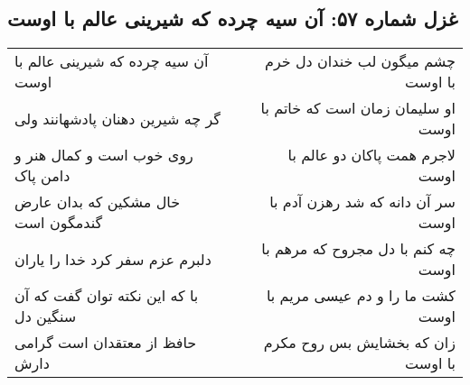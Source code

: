 \begin{center}
\section*{غزل شماره ۵۷: آن سیه چرده که شیرینی عالم با اوست}
\label{sec:sh057}
\begin{longtable}{l p{0.5cm} r}
آن سیه چرده که شیرینی عالم با اوست
&&
چشم میگون لب خندان دل خرم با اوست
\\
گر چه شیرین دهنان پادشهانند ولی
&&
او سلیمان زمان است که خاتم با اوست
\\
روی خوب است و کمال هنر و دامن پاک
&&
لاجرم همت پاکان دو عالم با اوست
\\
خال مشکین که بدان عارض گندمگون است
&&
سر آن دانه که شد رهزن آدم با اوست
\\
دلبرم عزم سفر کرد خدا را یاران
&&
چه کنم با دل مجروح که مرهم با اوست
\\
با که این نکته توان گفت که آن سنگین دل
&&
کشت ما را و دم عیسی مریم با اوست
\\
حافظ از معتقدان است گرامی دارش
&&
زان که بخشایش بس روح مکرم با اوست
\\
\end{longtable}
\end{center}
